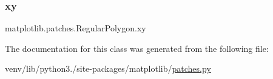 \subsubsection{\texorpdfstring{xy}{xy}}
{\footnotesize\ttfamily matplotlib.\+patches.\+Regular\+Polygon.\+xy}



The documentation for this class was generated from the following file\+:\begin{DoxyCompactItemize}
\item 
venv/lib/python3./site-\/packages/matplotlib/\hyperlink{patches_8py}{patches.\+py}\end{DoxyCompactItemize}
